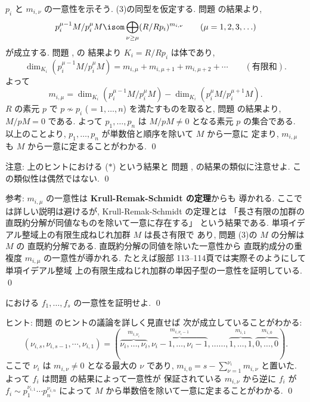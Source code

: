 \documentclass[12pt,twoside]{jarticle}
\begin{document}
$p_i$ と $m_{i,\nu}$ の一意性を示そう. (3)の同型を仮定する.
問題  の結果より,
\begin{equation*}
  p_i^{\mu-1}M/p_i^\mu M\isom
  \bigoplus_{\nu\ge\mu}
  (R/Rp_i)^{m_{i,\nu}}
  \qquad (\mu=1,2,3,\ldots)
\end{equation*}
が成立する. 問題 ,  の
結果より $K_i=R/Rp_i$ は体であり,
\begin{equation*}
  \dim_{K_i}(p_i^{\mu-1}M/p_i^\mu M) = 
  m_{i,\mu} + m_{i,\mu+1} + m_{i,\mu+2} + \cdots
  \qquad (\text{有限和}).
\end{equation*}
よって
\begin{equation*}
  m_{i,\mu} 
  = \dim_{K_i}(p_i^{\mu-1}M/p_i^\mu M)
  - \dim_{K_i}(p_i^{\mu}M/p_i^{\mu+1} M).
  \tag{$\ast$}
\end{equation*}
$R$ の素元 $p$ で $p\not\sim p_i$ ($=1,\dots,n$) を満たすものを取ると,
問題  の結果より, $M/pM=0$ である.  
よって $p_1,\dots,p_n$ は $M/pM\ne 0$ となる素元 $p$ の集合である.
以上のことより, $p_1,\dots,p_n$ が単数倍と順序を除いて $M$ から一意に
定まり, $m_{i,\mu}$ も $M$ から一意に定まることがわかる.
\qed

\medskip
\noindent
注意: 上のヒントにおける ($\ast$) という結果と
問題  ,  の結果の類似に注意せよ.
この類似性は偶然ではない.
\qed

\medskip
\noindent
参考: $m_{i,\mu}$ の一意性は {\bf Krull-Remak-Schmidt の定理}からも
導かれる.  ここでは詳しい説明は避けるが, Krull-Remak-Schmidt の定理とは
「長さ有限の加群の直既約分解が同値なものを除いて一意に存在する」
という結果である. 単項イデアル整域上の有限生成ねじれ加群 $M$ は長さ有限で
あり, 問題  (3)の $M$ の分解は $M$ の
直既約分解である.   直既約分解の同値を除いた一意性から
直既約成分の重複度 $m_{i,\mu}$ の一意性が導かれる.
たとえば服部 \cite{hattori} 113--114頁では実際そのようにして単項イデアル整域
上の有限生成ねじれ加群の単因子型の一意性を証明している.
\qed


\begin{question}
  における $f_1,\dots,f_s$ の一意性を証明せよ.
  \qed
\end{question}

\noindent
ヒント: 問題  のヒントの議論を詳しく見直せば
次が成立していることがわかる:
\begin{equation*}
  (\nu_{i,s},\nu_{i,s-1},\cdots,\nu_{i,1}) = (
    \overbrace{\nu_i,\dots,\nu_i}^{m_{i,\nu_i}},
    \overbrace{\nu_i-1,\dots,\nu_i-1}^{m_{i,\nu_i-1}},
    \dots\dots,
    \overbrace{1,\dots,1}^{m_{i,1}},
    \overbrace{0,\dots,0}^{m_{i,0}}
  ).
\end{equation*}
ここで $\nu_i$ は $m_{i,\nu}\ne 0$ となる最大の $\nu$ であり,
$m_{i,0} = s - \sum_{\nu=1}^{\nu_i}m_{i,\nu}$ と置いた.
よって $f_i$ は問題  の結果によって一意性が
保証されている $m_{i,\nu}$ から逆に $f_i$ が $
  f_i\sim p_1^{\nu_{i,1}}\cdots p_n^{\nu_{i,n}}
$ によって $M$ から単数倍を除いて一意に定まることがわかる.
\qed
\end{document}
